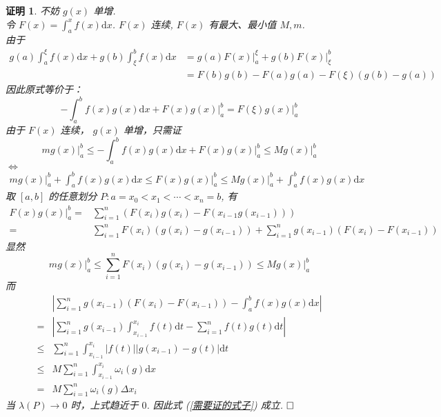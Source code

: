 \documentclass{ctexart}
\newcommand{\。}{．} %
\newcommand{\dx}{\mathrm{d}x}
\newcommand{\dd}{\mathrm{d}}
\newenvironment{lanse}{
    \begin{tcolorbox}[enhanced, breakable, colback=qlan, boxrule=0pt, frame hidden,
        borderline west={0.7mm}{0.1mm}{slan}]
    }
    {\end{tcolorbox}}
\theoremstyle{t} %
\newtheorem*{zmhj}{\color{slan} 证明}
\newenvironment{zm}{\begin{lanse}\begin{zmhj}}{$\hfill \square$\end{zmhj}\end{lanse}}
\begin{document}
\begin{zm}
    不妨 $g(x)$ 单增. \\
    令 $F(x) = \int_{a}^{x}f(x) \dx$. $F(x)$ 连续, $F(x)$ 有最大、最小值 $M, m$.\\
    由于 
    \begin{align*}
        g(a)\int_{a}^{\xi}f(x)\dx + g(b) \int_{\xi}^{b}f(x) \dx &= g(a)F(x)\bigg|_a^{\xi} + g(b)F(x)\bigg|_{\xi}^b \\
        &= F(b)g(b) - F(a)g(a) - F(\xi)(g(b) - g(a))
    \end{align*}
    因此原式等价于：
    \[
        -\int_{a}^{b}f(x)g(x)\dx + F(x)g(x)\bigg|_a^b = F(\xi)g(x)\bigg|_a^b
    \]
    由于 $F(x)$ 连续， $g(x)$ 单增，只需证
    \[
        mg(x)\bigg|_a^b \leqslant -\int_{a}^{b}f(x)g(x)\dx + F(x)g(x)\bigg|_a^b \leqslant Mg(x)\bigg|_a^b
    \] $\Leftrightarrow$
    \begin{align}\label{需要证的式子}
        mg(x)\bigg|_a^b + \int_{a}^{b}f(x)g(x)\dx \leqslant F(x)g(x)\bigg|_a^b \leqslant Mg(x)\bigg|_a^b + \int_{a}^{b}f(x)g(x)\dx
    \end{align}
    取 $[a, b]$ 的任意划分 $P: a = x_0 < x_1 < \cdots < x_n = b$, 有
    \begin{align*}
        F(x)g(x)\bigg|_a^b =& \sum_{i = 1}^{n}\left(F(x_i)g(x_i) - F(x_{i - 1}g(x_{i - 1}))\right) \\
        =& \sum_{i = 1}^{n}F(x_i)(g(x_i) - g(x_{i - 1})) + \sum_{i = 1}^{n}g(x_{i - 1})(F(x_i) - F(x_{i - 1}))
    \end{align*}
    显然
    \[
        mg(x)\bigg|_a^b \leqslant \sum_{i = 1}^{n}F(x_i)(g(x_i) - g(x_{i - 1})) \leqslant Mg(x)\bigg|_a^b
    \]
    而
    \begin{align*}
        &\left\lvert \sum_{i = 1}^{n}g(x_{i - 1})(F(x_i) - F(x_{i - 1})) - \int_{a}^{b}f(x)g(x)\dx\right\rvert \\
        = & \left\lvert \sum_{i = 1}^{n}g(x_{i - 1})\int_{x_{i - 1}}^{x_i}f(t)\dd t - \sum_{i = 1}^{n}f(t)g(t)\dd t\right\rvert \\
        \leqslant & \sum_{i = 1}^{n}\int_{x_{i - 1}}^{x_i}\left\lvert f(t)\right\rvert \left\lvert g(x_{i - 1}) - g(t)\right\rvert \dd t \\
        \leqslant & M \sum_{i = 1}^{n}\int_{x_{i - 1}}^{x_i}\omega_i(g)\dx \\
        = & M \sum_{i = 1}^{n}\omega_i(g)\Delta x_i
    \end{align*}
    当 $\lambda(P) \to 0$ 时，上式趋近于 $0$. 因此式 (\ref{需要证的式子}) 成立. 
\end{zm}
\end{document}
